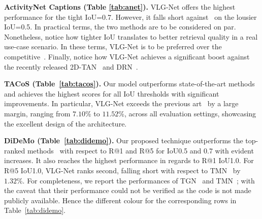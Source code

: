 \documentclass[10pt,twocolumn,letterpaper]{article}
\begin{document}
\noindent\textbf{ActivityNet Captions (Table \ref{tab:anet}).}
VLG-Net offers the highest performance for the tight IoU=0.7. However, it falls short against~\cite{liu2020jointly} on the lousier IoU=0.5. In practical terms, the two methods are to be considered on par. Nonetheless, notice how tighter IoU translates to better retrieval quality in a real use-case scenario. In these terms, VLG-Net is to be preferred over the competitive~\cite{liu2020jointly}. Finally, notice how VLG-Net achieves a significant boost against the recently released 2D-TAN~\cite{2DTAN_2020_AAAI} and DRN~\cite{Zeng_2020_CVPR}.

\noindent\textbf{TACoS (Table~\ref{tab:tacos}).}
Our model outperforms state-of-the-art methods and achieves the highest scores for all IoU thresholds with significant improvements. In particular, VLG-Net exceeds the previous art~\cite{liu2020jointly,Zeng_2020_CVPR,2DTAN_2020_AAAI} by a large margin, ranging from $7.10$\% to $11.52$\%, across all evaluation settings, showcasing the excellent design of the architecture. 

\noindent\textbf{DiDeMo (Table~\ref{tab:didemo}).  }
Our proposed technique outperforms the top-ranked methods~\cite{liu2020jointly,ACRN_SIGIR_18,10.1145/3240508.3240549} with respect to R@1 and R@5 for IoU0.5 and 0.7 with evident increases. It also reaches the highest performance in regards to R@1 IoU1.0. For R@5 IoU1.0, VLG-Net ranks second, falling short with respect to TMN~\cite{chen_etal_2018_temporally} by $1.32\%$.
For completeness, we report the performances of TGN~\cite{Liu_2018_ECCV} and TMN~\cite{chen_etal_2018_temporally}; with the caveat that their performance could not be verified as the code is not made publicly available. Hence the different colour for the corresponding rows in Table~\ref{tab:didemo}.
\end{document}

